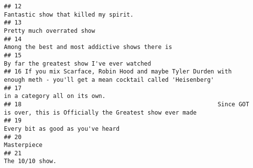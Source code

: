 \documentclass[
]{article}
\begin{document}
\begin{verbatim}
## 12                                                                                    Fantastic show that killed my spirit.
## 13                                                                                               Pretty much overrated show
## 14                                                                         Among the best and most addictive shows there is
## 15                                                                               By far the greatest show I've ever watched
## 16 If you mix Scarface, Robin Hood and maybe Tyler Durden with enough meth - you'll get a mean cocktail called 'Heisenberg'
## 17                                                                                            in a category all on its own.
## 18                                                        Since GOT is over, this is Officially the Greatest show ever made
## 19                                                                                        Every bit as good as you've heard
## 20                                                                                                              Masterpiece
## 21                                                                                                          The 10/10 show.

\end{verbatim}
\end{document}
